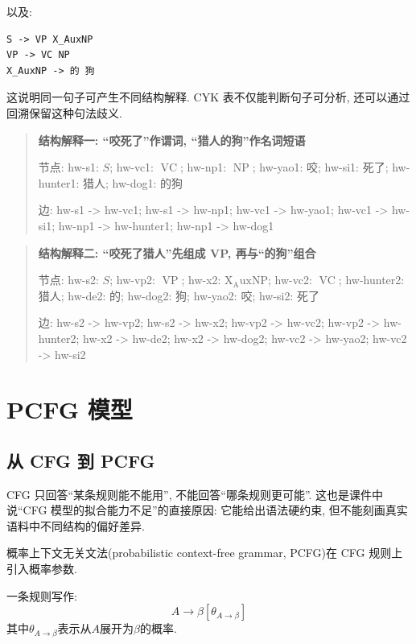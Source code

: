 以及:

\begin{Verbatim}[breaklines=true,breakanywhere=true,fontsize=\small]
S -> VP X_AuxNP
VP -> VC NP
X_AuxNP -> 的 狗
\end{Verbatim}

这说明同一句子可产生不同结构解释.
CYK 表不仅能判断句子可分析, 还可以通过回溯保留这种句法歧义.

\begin{quote}
\small
\textbf{结构解释一: “咬死了”作谓词, “猎人的狗”作名词短语}
\par 节点: hw-s1: $S$; hw-vc1: $\operatorname{VC}$; hw-np1: $\operatorname{NP}$; hw-yao1: 咬; hw-si1: 死了; hw-hunter1: 猎人; hw-dog1: 的狗
\par 边: hw-s1 -\textgreater{} hw-vc1; hw-s1 -\textgreater{} hw-np1; hw-vc1 -\textgreater{} hw-yao1; hw-vc1 -\textgreater{} hw-si1; hw-np1 -\textgreater{} hw-hunter1; hw-np1 -\textgreater{} hw-dog1
\end{quote}

\begin{quote}
\small
\textbf{结构解释二: “咬死了猎人”先组成 VP, 再与“的狗”组合}
\par 节点: hw-s2: $S$; hw-vp2: $\operatorname{VP}$; hw-x2: $\operatorname{X_AuxNP}$; hw-vc2: $\operatorname{VC}$; hw-hunter2: 猎人; hw-de2: 的; hw-dog2: 狗; hw-yao2: 咬; hw-si2: 死了
\par 边: hw-s2 -\textgreater{} hw-vp2; hw-s2 -\textgreater{} hw-x2; hw-vp2 -\textgreater{} hw-vc2; hw-vp2 -\textgreater{} hw-hunter2; hw-x2 -\textgreater{} hw-de2; hw-x2 -\textgreater{} hw-dog2; hw-vc2 -\textgreater{} hw-yao2; hw-vc2 -\textgreater{} hw-si2
\end{quote}

\section{PCFG 模型}


\subsection{从 CFG 到 PCFG}


CFG 只回答“某条规则能不能用”, 不能回答“哪条规则更可能”.
这也是课件中说“CFG 模型的拟合能力不足”的直接原因:
它能给出语法硬约束, 但不能刻画真实语料中不同结构的偏好差异.

概率上下文无关文法(probabilistic context-free grammar, PCFG)在 CFG 规则上引入概率参数.

一条规则写作:
\[
A \to \beta [\theta_{A \to \beta}]
\]
其中$\theta_{A \to \beta}$表示从$A$展开为$\beta$的概率.

